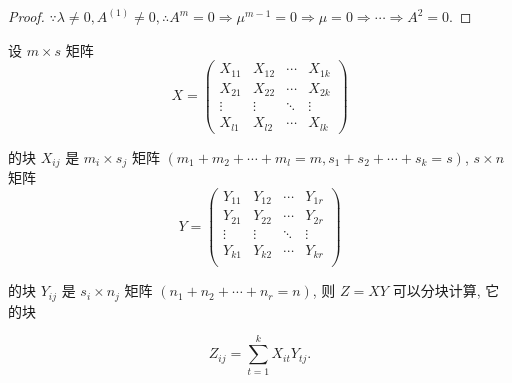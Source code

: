 \documentclass{ctexart}
\begin{document}
\begin{proof}
    $\because\lambda\neq0,A^{(1)}\neq0,\therefore A^m=0\Rightarrow \mu^{m-1}=0\Rightarrow \mu=0\Rightarrow\cdots\Rightarrow A^2=0$.
\end{proof}
\begin{exercise}%
    设 $m\times s$ 矩阵
    \[X=\begin{pmatrix}
        X_{11} & X_{12} & \cdots & X_{1k} \\
        X_{21} & X_{22} & \cdots & X_{2k} \\
        \vdots & \vdots & \ddots & \vdots \\
        X_{l1} & X_{l2} & \cdots & X_{lk}
    \end{pmatrix}\]

    的块 $X_{ij}$ 是 $m_i\times s_j$ 矩阵 $(m_1+m_2+\cdots+m_l=m,s_1+s_2+\cdots+s_k=s)$, $s\times n$ 矩阵
    \[Y=\begin{pmatrix}
        Y_{11} & Y_{12} & \cdots & Y_{1r} \\
        Y_{21} & Y_{22} & \cdots & Y_{2r} \\
        \vdots & \vdots & \ddots & \vdots \\
        Y_{k1} & Y_{k2} & \cdots & Y_{kr} \\
    \end{pmatrix}\]

    的块 $Y_{ij}$ 是 $s_i\times n_j$ 矩阵 $(n_1+n_2+\cdots+n_r=n)$, 则 $Z=XY$ 可以分块计算, 它的块

    \[Z_{ij}=\sum\limits_{t=1}^kX_{it}Y_{tj}.\]
\end{exercise}
\end{document}
